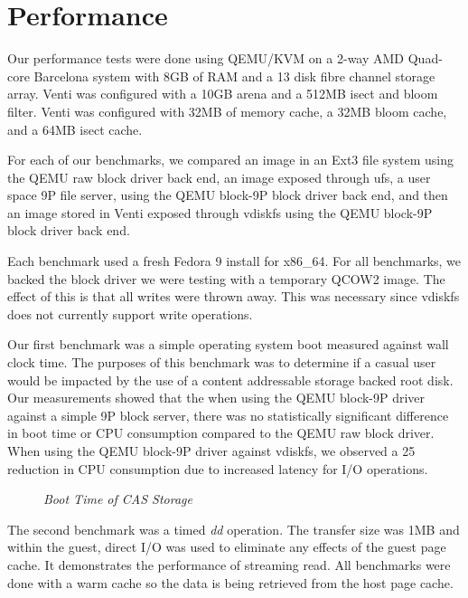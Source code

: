 \section{Performance}

Our performance tests were done using QEMU/KVM on a 
2-way AMD Quad-core Barcelona system with 8GB of
RAM and a 13 disk fibre channel storage array. Venti
was configured with a 10GB arena and a 512MB isect
and bloom filter. Venti was configured with 32MB of
memory cache, a 32MB bloom cache, and a 64MB isect cache.

For each of our benchmarks, we compared an image
in an Ext3 file system using the QEMU raw block driver
back end, an image exposed through ufs, a user space 9P
file server, using the QEMU block-9P block driver back
end, and then an image stored in Venti exposed through
vdiskfs using the QEMU block-9P block driver back end.

Each benchmark used a fresh Fedora 9 install for
x86\_64. For all benchmarks, we backed the block driver
we were testing with a temporary QCOW2 image. The 
effect of this is that all writes were thrown away. This was
necessary since vdiskfs does not currently support write
operations.

Our first benchmark was a simple operating system
boot measured against wall clock time. The purposes of
this benchmark was to determine if a casual user would
be impacted by the use of a content addressable storage
backed root disk.
Our measurements showed that the when using the QEMU
block-9P driver against a simple 9P block server, there
was no statistically significant difference in boot time
or CPU consumption compared to the QEMU raw block driver.
When using the QEMU block-9P driver against vdiskfs,
we observed a 25%
reduction in CPU consumption due to increased latency for
I/O operations.

\begin{figure}[htbp]
\begin{centering}
\small\itshape
\caption{\small\itshape Boot Time of CAS Storage}
\label{fig:bootup}
\end{centering}
\end{figure}

The second benchmark was a timed \emph{dd} operation.
The transfer size was 1MB and within the guest, direct
I/O was used to eliminate any effects of the guest page
cache. It demonstrates the performance of streaming
read. All benchmarks were done with a warm cache so the
data is being retrieved from the host page cache.

